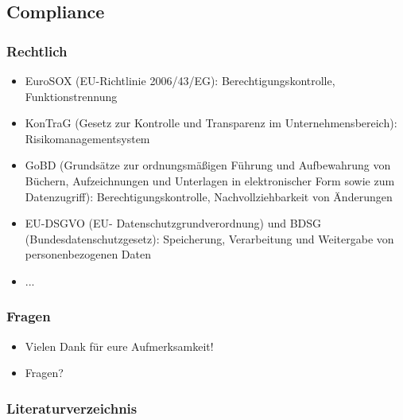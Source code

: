 \documentclass[11pt]{beamer}
\begin{document}
\subsection{Compliance}
\begin{frame}
  \frametitle{Rechtlich}
  \begin{itemize}
    \item EuroSOX (EU-Richtlinie 2006/43/EG): Berechtigungskontrolle, Funktionstrennung
    \item KonTraG (Gesetz zur Kontrolle und Transparenz im Unternehmensbereich): Risikomanagementsystem
    \item GoBD (Grundsätze zur ordnungsmäßigen Führung und Aufbewahrung von Büchern, Aufzeichnungen und Unterlagen in elektronischer Form sowie zum Datenzugriff): Berechtigungskontrolle, Nachvollziehbarkeit von Änderungen
    \item EU-DSGVO (EU- Datenschutzgrundverordnung) und BDSG (Bundesdatenschutzgesetz): Speicherung, Verarbeitung und Weitergabe von personenbezogenen Daten
    \item ...
  \end{itemize}
\end{frame}

\begin{frame}
  \frametitle{Fragen}
  \begin{itemize}
    \item Vielen Dank für eure Aufmerksamkeit!
    \item Fragen?
  \end{itemize}
\end{frame}

\begin{frame}[allowframebreaks]
  \frametitle{Literaturverzeichnis}
  \printbibliography
\end{frame}
\end{document}
